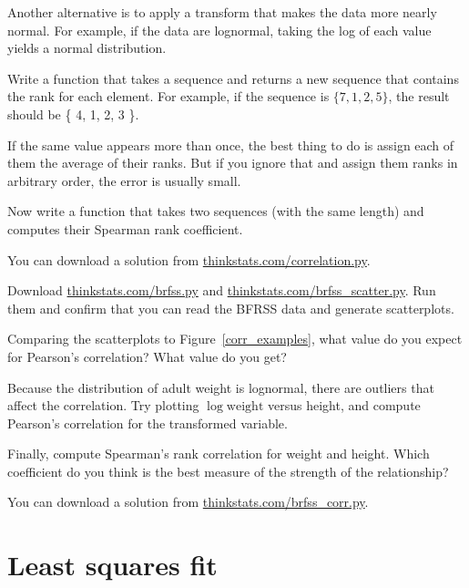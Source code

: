 \documentclass[12pt]{book}
\begin{document}
Another alternative is to apply a transform that makes the data more
nearly normal.  For example, if the data are lognormal, taking the log
of each value yields a normal distribution.

\begin{ex}

Write a function that takes a sequence and returns a new
sequence that contains the rank for each element.  For example,
if the sequence is $\{ 7, 1, 2, 5 \}$, the result should be
\{ 4, 1, 2, 3 \}.

If the same value appears more than once, the best thing to do
is assign each of them the average of
their ranks.  But if you ignore that and assign them ranks in
arbitrary order, the error is usually small.

Now write a function that takes two sequences (with the same
length) and computes their Spearman rank coefficient.

You can download a solution from
\url{thinkstats.com/correlation.py}.

\end{ex}


\begin{ex}

Download \url{thinkstats.com/brfss.py} and
\url{thinkstats.com/brfss_scatter.py}.  Run them and confirm that you
can read the BFRSS data and generate scatterplots.

Comparing the scatterplots to Figure~\ref{corr_examples}, what value
do you expect for Pearson's correlation?  What value do you get?

Because the distribution of adult weight is lognormal, there are
outliers that affect the correlation.  Try plotting $\log
\mathrm{weight}$ versus height, and compute Pearson's correlation for
the transformed variable.

Finally, compute Spearman's rank correlation for weight and height.
Which coefficient do you think is the best
measure of the strength of the relationship?

You can download a solution from
\url{thinkstats.com/brfss_corr.py}.

\end{ex}


\section{Least squares fit}

\newcommand{\slope}{\beta}
\newcommand{\inter}{\alpha}
\end{document}
